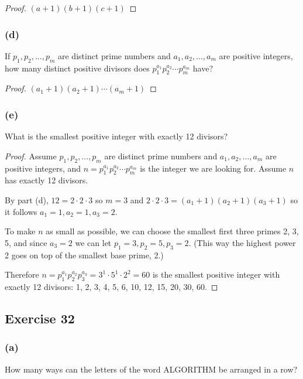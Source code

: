\documentclass[14pt]{extarticle}
\begin{document}
\begin{proof}
     \((a+1)(b+1)(c+1)\)
\end{proof}

\subsubsection{(d)}
If \(p_1, p_2, \ldots, p_m\) are distinct prime numbers and \(a_1, a_2, \ldots, a_m\) are positive integers, how many
distinct positive divisors does \(p_1^{a_1} p_2^{a_2} \cdots p_m^{a_m}\) have?

\begin{proof}
     \((a_1+1)(a_2+1) \cdots (a_m+1)\)
\end{proof}

\subsubsection{(e)}
What is the smallest positive integer with exactly 12 divisors?

\begin{proof}
     Assume \(p_1, p_2, \ldots, p_m\) are distinct prime numbers and \(a_1, a_2, \ldots, a_m\) are positive integers, and
     \(n = p_1^{a_1} p_2^{a_2} \cdots p_m^{a_m}\) is the integer we are looking for. Assume $n$ has exactly 12 divisors.

     By part (d), \(12 = 2 \cdot 2 \cdot 3\) so $m=3$ and \(2 \cdot 2 \cdot 3 = (a_1+1)(a_2+1)(a_3+1)\) so it follows
     \(a_1 = 1, a_2 = 1, a_3 = 2\).

     To make $n$ as small as possible, we can choose the smallest first three primes 2, 3, 5, and since \(a_3 = 2\)
     we can let \(p_1 = 3, p_2 = 5, p_3 = 2\). (This way the highest power 2 goes on top of the smallest base prime, 2.)

     Therefore \(n = p_1^{a_1} p_2^{a_2} p_3^{a_3} = 3^1 \cdot 5^1 \cdot 2^2 = 60\) is the smallest positive integer with
     exactly 12 divisors: 1, 2, 3, 4, 5, 6, 10, 12, 15, 20, 30, 60.
\end{proof}

\subsection{Exercise 32}
\subsubsection{(a)}
How many ways can the letters of the word ALGORITHM be arranged in a row?
\end{document}
